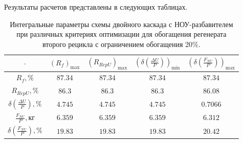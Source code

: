 Результаты расчетов представлены в следующих таблицах.


\begin{table}
    \begin{tabular}{ccccc}
        $\cdot$ & $(R_f)_\text{max}$ & $(R_{RepU})_\text{max}$ & $(\delta(\frac{\Delta U}{P}))_\text{min}$ & $(\delta(\frac{F_{NU}}{P}))_\text{max}$\\ \hline
        $R_f, \%$ & $87.34$ & $87.34$ & $87.34$ & $87.34$\\ \hline
        $R_{RepU}, \%$ & $86.3$ & $86.3$ & $86.3$ & $86.08$\\ \hline
        $\delta(\frac{\Delta U}{P}), \%$ & $4.745$ & $4.745$ & $4.745$ & $0.7066$\\ \hline
        $\frac{F_{NU}}{P}, \text{кг}$ & $6.359$ & $6.359$ & $6.359$ & $6.312$\\ \hline
        $\delta(\frac{F_{NU}}{P}), \%$ & $19.83$ & $19.83$ & $19.83$ & $20.42$\\ \hline
    \end{tabular}
    \caption{Интегральные параметры схемы двойного каскада с НОУ-разбавителем при различных критериях оптимизации для обогащения регенерата второго рецикла с ограничением обогащения 20\%.{\label{2opt2_20_int}}}
\end{table}



